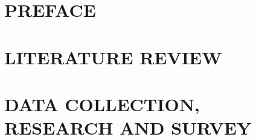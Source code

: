 \documentclass[a4paper,13pt,twoside]{extreport}
\theoremstyle{definition}
\begin{document}
\renewcommand{\listtablename}{LIST OF TABLES}
{\let\oldnumberline\numberline
	\renewcommand{\numberline}{Table~\oldnumberline}
	\listoftables}

\glsaddall
\renewcommand*{\acronymname}{LIST OF ABBREVIATIONS}
\renewcommand*{\entryname}{Abriviation}
\renewcommand*{\descriptionname}{Full Expression}


% 


\newpage
{}

\pagestyle{fancy}
\fancyhf{}
\fancyhead[RE, LO]{\leftmark}
\fancyfoot[RE, LO]{\thepage}

\chapter{PREFACE}
\label{chapter:Preface}


\newpage
\pagestyle{fancy}
\chapter{LITERATURE REVIEW}
\label{chapter:Literature_review}


\newpage
\pagestyle{fancy}
\chapter{DATA COLLECTION, RESEARCH AND SURVEY}
\label{chapter:Data_collection_research_and_survey}


% 

% 
\end{document}
